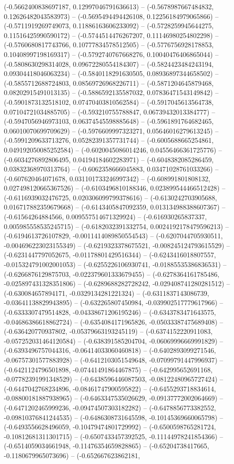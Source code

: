 	(-0.5662400838697187, 0.12997046791636613) -- (-0.5678987667484832, 0.12626482043583973) -- (-0.5695494494426108, 0.12256184979065866) -- (-0.5711919269749073, 0.11886163606233092) -- (-0.5728259945644275, 0.11516425990590172) -- (-0.5744514476267207, 0.11146980254802298) -- (-0.5760680817743766, 0.10777834578512505) -- (-0.5776756928178853, 0.10408997198169317) -- (-0.5792740767668276, 0.10040476406865044) -- (-0.5808630298314028, 0.09672280554184307) -- (-0.5824423484243194, 0.09304418046063234) -- (-0.5840118291630505, 0.08936897344658502) -- (-0.5855712688724803, 0.08569726968226711) -- (-0.5871204645879468, 0.08202915491013135) -- (-0.5886592135587032, 0.07836471543149842) -- (-0.5901873132518102, 0.07470403810562584) -- (-0.5917045613564738, 0.07104721034885705) -- (-0.593210755788847, 0.06739432013384777) -- (-0.5947056946973103, 0.06374545598885648) -- (-0.5961891764682465, 0.06010070699709629) -- (-0.5976609997323271, 0.05646016279613245) -- (-0.5991209633713276, 0.05282391357731744) -- (-0.6005688665254861, 0.049192050085252584) -- (-0.6020045086014246, 0.04556466361725776) -- (-0.6034276892806495, 0.04194184602283971) -- (-0.6048382085286459, 0.03832368970313764) -- (-0.6062358666045883, 0.03471028761033266) -- (-0.607620464071678, 0.031101733246997342) -- (-0.608991801808132, 0.027498120665367526) -- (-0.6103496810188346, 0.023899544466512428) -- (-0.6116939032476725, 0.020306099799378616) -- (-0.6130242703905688, 0.016717882359679668) -- (-0.6143405847092359, 0.013134988388607367) -- (-0.61564264884566, 0.009557514671329924) -- (-0.616930265837337, 0.005985558535245715) -- (-0.6182032391332754, 0.0024192178479596213) -- (-0.6194613726107829, -0.0011414089850554543) -- (-0.6207044705930511, -0.004696223023155349) -- (-0.6219323378675521, -0.008245124793615529) -- (-0.6231447797052675, -0.01178801429516344) -- (-0.6243416018807557, -0.015324791002001053) -- (-0.6255226106930741, -0.01885535386836531) -- (-0.6266876129875703, -0.022379601333679455) -- (-0.6278364161785486, -0.025897431328351806) -- (-0.6289688282728242, -0.029408741280281512) -- (-0.630084657894171, -0.0329134281221324) -- (-0.6311837143086739, -0.03641138829943895) -- (-0.632265807450984, -0.039902517779617966) -- (-0.6333307479514828, -0.04338671206195246) -- (-0.6343783471643575, -0.04686386618862724) -- (-0.6354084171965826, -0.05033387475689408) -- (-0.636420770937802, -0.05379663193245119) -- (-0.6374152220911083, -0.057252031464120584) -- (-0.638391585204704, -0.06069996669991829) -- (-0.6393496757044316, -0.06414033060460818) -- (-0.6402893099271546, -0.06757301577883928) -- (-0.6412103051549648, -0.07099791447996937) -- (-0.6421124796501898, -0.07441491864467875) -- (-0.642995652691168, -0.07782391991348529) -- (-0.6438596446087503, -0.08122480965727424) -- (-0.6447042768234896, -0.08461747900595822) -- (-0.6455293718834614, -0.08800181887938965) -- (-0.6463347535026629, -0.09137772002064669) -- (-0.6471202465999236, -0.09474507303182282) -- (-0.6478856773382552, -0.09810376841244535) -- (-0.6486308731645598, -0.10145369660065798) -- (-0.6493556628496059, -0.10479474801729992) -- (-0.6500598765281724, -0.10812681311301715) -- (-0.6507433457392525, -0.11144978241854366) -- (-0.6514059034661948, -0.11476354659828865) -- (-0.65204738417665, -0.1180679965073696) -- (-0.652667623862181, 